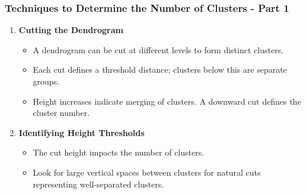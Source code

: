 \documentclass[aspectratio=169]{beamer}
\begin{document}
\begin{frame}[fragile]
    \frametitle{Techniques to Determine the Number of Clusters - Part 1}
    \begin{enumerate}
        \item \textbf{Cutting the Dendrogram}
            \begin{itemize}
                \item A dendrogram can be cut at different levels to form distinct clusters.
                \item Each cut defines a threshold distance; clusters below this are separate groups.
                \item Height increases indicate merging of clusters. A downward cut defines the cluster number.
            \end{itemize}

        \item \textbf{Identifying Height Thresholds}
            \begin{itemize}
                \item The cut height impacts the number of clusters.
                \item Look for large vertical spaces between clusters for natural cuts representing well-separated clusters.
            \end{itemize}
    \end{enumerate}
\end{frame}
\end{document}
